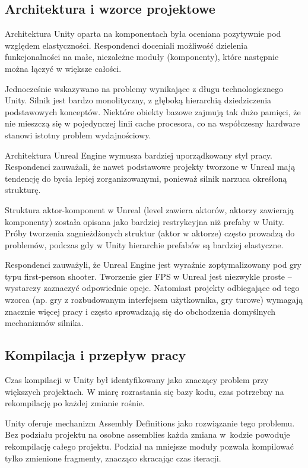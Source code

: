 \subsection{Architektura i wzorce projektowe}
\label{subsec:architektura}


Architektura Unity oparta na komponentach była oceniana pozytywnie pod względem elastyczności. Respondenci doceniali możliwość dzielenia funkcjonalności na małe, niezależne moduły (komponenty), które następnie można łączyć w większe całości.

Jednocześnie wskazywano na problemy wynikające z długu technologicznego Unity. Silnik jest bardzo monolityczny, z głęboką hierarchią dziedziczenia podstawowych konceptów. Niektóre obiekty bazowe zajmują tak dużo pamięci, że nie mieszczą się w pojedynczej linii cache procesora, co na współczesny hardware stanowi istotny problem wydajnościowy.


Architektura Unreal Engine wymusza bardziej uporządkowany styl pracy. Respondenci zauważali, 
że nawet podstawowe projekty tworzone w Unreal mają tendencję do bycia lepiej zorganizowanymi, 
ponieważ silnik narzuca określoną strukturę.

Struktura aktor-komponent w Unreal (level zawiera aktorów, aktorzy zawierają komponenty) została opisana jako bardziej restrykcyjna niż prefaby w Unity. Próby tworzenia zagnieżdżonych struktur (aktor w aktorze) często prowadzą do problemów, podczas gdy w Unity hierarchie prefabów są bardziej elastyczne.


Respondenci zauważyli, że Unreal Engine jest wyraźnie zoptymalizowany pod gry typu first-person shooter. Tworzenie gier FPS w Unreal jest niezwykle proste -- wystarczy zaznaczyć odpowiednie opcje. Natomiast projekty odbiegające od tego wzorca (np. gry z rozbudowanym interfejsem użytkownika, gry turowe) wymagają znacznie więcej pracy i często sprowadzają się do obchodzenia domyślnych mechanizmów silnika.

\subsection{Kompilacja i przepływ pracy}
\label{subsec:kompilacja}


Czas kompilacji w Unity był identyfikowany jako znaczący problem przy większych projektach. W miarę rozrastania się bazy kodu, czas potrzebny na rekompilację po każdej zmianie rośnie.

Unity oferuje mechanizm Assembly Definitions jako rozwiązanie tego
problemu. Bez podziału projektu na osobne assemblies każda zmiana w~kodzie powoduje rekompilację całego projektu. Podział na mniejsze moduły pozwala kompilować tylko zmienione fragmenty, znacząco skracając czas iteracji.


